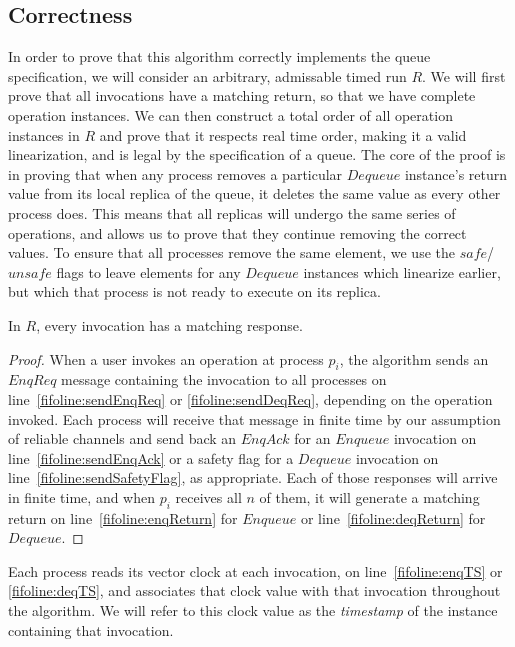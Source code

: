\documentclass[a4paper,anonymous,USenglish]{lipics-v2021} %
\theoremstyle{definition}
\begin{document}
\subsection{Correctness}\label{sec:fifoCorrectness}
In order to prove that this algorithm correctly implements the queue specification, we will consider an arbitrary, admissable timed run $R$.  We will first prove that all invocations have a matching return, so that we have complete operation instances.  We can then construct a total order of all operation instances in $R$ and prove that it respects real time order, making it a valid linearization, and is legal by the specification of a queue.  The core of the proof is in proving that when any process removes a particular $Dequeue$ instance's return value from its local replica of the queue, it deletes the same value as every other process does.  This means that all replicas will undergo the same series of operations, and allows us to prove that they continue removing the correct values.  To ensure that all processes remove the same element, we use the $safe$/$unsafe$ flags to leave elements for any $Dequeue$ instances which linearize earlier, but which that process is not ready to execute on its replica.

\begin{lemma}\label{fifolem:responses}
  In $R$, every invocation has a matching response.
\end{lemma}

\begin{proof}
When a user invokes an operation at process $p_i$, the algorithm sends an $EnqReq$ message containing the invocation to all processes on line~\ref{fifoline:sendEnqReq} or \ref{fifoline:sendDeqReq}, depending on the operation invoked.  Each process will receive that message in finite time by our assumption of reliable channels and send back an $EnqAck$ for an $Enqueue$ invocation on line~\ref{fifoline:sendEnqAck} or a safety flag for a $Dequeue$ invocation on line~\ref{fifoline:sendSafetyFlag}, as appropriate.  Each of those responses will arrive in finite time, and when $p_i$ receives all $n$ of them, it will generate a matching return on line~\ref{fifoline:enqReturn} for $Enqueue$ or line~\ref{fifoline:deqReturn} for $Dequeue$.
\end{proof}

Each process reads its vector clock at each invocation, on line~\ref{fifoline:enqTS} or \ref{fifoline:deqTS}, and associates that clock value with that invocation throughout the algorithm.  We will refer to this clock value as the \emph{timestamp} of the instance containing that invocation.
\end{document}
